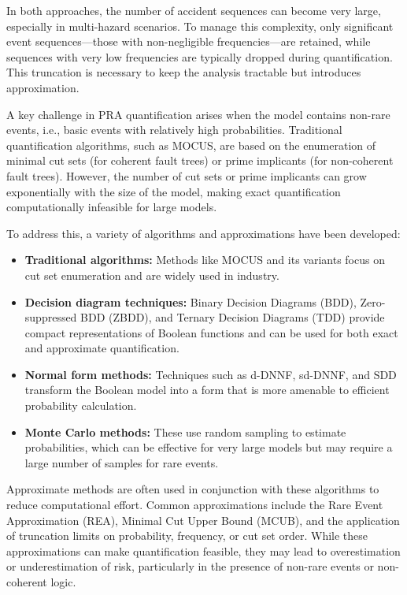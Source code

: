 In both approaches, the number of accident sequences can become very large, especially in multi-hazard scenarios. To manage this complexity, only significant event sequences—those with non-negligible frequencies—are retained, while sequences with very low frequencies are typically dropped during quantification. This truncation is necessary to keep the analysis tractable but introduces approximation.

A key challenge in PRA quantification arises when the model contains non-rare events, i.e., basic events with relatively high probabilities. Traditional quantification algorithms, such as MOCUS, are based on the enumeration of minimal cut sets (for coherent fault trees) or prime implicants (for non-coherent fault trees). However, the number of cut sets or prime implicants can grow exponentially with the size of the model, making exact quantification computationally infeasible for large models.

To address this, a variety of algorithms and approximations have been developed:
\begin{itemize}
    \item \textbf{Traditional algorithms:} Methods like MOCUS and its variants focus on cut set enumeration and are widely used in industry.
    \item \textbf{Decision diagram techniques:} Binary Decision Diagrams (BDD), Zero-suppressed BDD (ZBDD), and Ternary Decision Diagrams (TDD) provide compact representations of Boolean functions and can be used for both exact and approximate quantification.
    \item \textbf{Normal form methods:} Techniques such as d-DNNF, sd-DNNF, and SDD transform the Boolean model into a form that is more amenable to efficient probability calculation.
    \item \textbf{Monte Carlo methods:} These use random sampling to estimate probabilities, which can be effective for very large models but may require a large number of samples for rare events.
\end{itemize}

Approximate methods are often used in conjunction with these algorithms to reduce computational effort. Common approximations include the Rare Event Approximation (REA), Minimal Cut Upper Bound (MCUB), and the application of truncation limits on probability, frequency, or cut set order. While these approximations can make quantification feasible, they may lead to overestimation or underestimation of risk, particularly in the presence of non-rare events or non-coherent logic.

